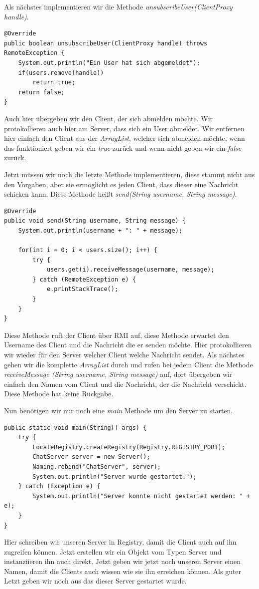 
Als nächstes implementieren wir die Methode \textit{unsubscribeUser(ClientProxy handle)}.
\begin{lstlisting}
@Override
public boolean unsubscribeUser(ClientProxy handle) throws RemoteException {
	System.out.println("Ein User hat sich abgemeldet");
	if(users.remove(handle))
		return true;
	return false;
}
\end{lstlisting}
Auch hier übergeben wir den Client, der sich abmelden möchte. Wir protokollieren auch hier am Server, dass sich ein User abmeldet. Wir entfernen hier einfach den Client aus der \textit{ArrayList}, welcher sich abmelden möchte, wenn das funktioniert geben wir ein \textit{true} zurück und wenn nicht geben wir ein \textit{false} zurück.


Jetzt müssen wir noch die letzte Methode implementieren, diese stammt nicht aus den Vorgaben, aber sie ermöglicht es jeden Client, dass dieser eine Nachricht schicken kann. Diese Methode heißt \textit{send(String username, String message)}.
\begin{lstlisting}
@Override
public void send(String username, String message) {
	System.out.println(username + ": " + message);
	
	for(int i = 0; i < users.size(); i++) {
		try {
			users.get(i).receiveMessage(username, message);
		} catch (RemoteException e) {
			e.printStackTrace();		
		}
	}
}
\end{lstlisting}
Diese Methode ruft der Client über RMI auf, diese Methode erwartet den Username des Client und die Nachricht die er senden möchte. Hier protokollieren wir wieder für den Server welcher Client welche Nachricht sendet. Als nächstes gehen wir die komplette \textit{ArrayList} durch und rufen bei jedem Client die Methode \textit{receiveMessage (String username, String message)} auf, dort übergeben wir einfach den Namen vom Client und die Nachricht, der die Nachricht verschickt. Diese Methode hat keine Rückgabe.


Nun benötigen wir nur noch eine \textit{main} Methode um den Server zu starten.
\begin{lstlisting}
public static void main(String[] args) {
	try {
		LocateRegistry.createRegistry(Registry.REGISTRY_PORT);
		ChatServer server = new Server();
		Naming.rebind("ChatServer", server);
		System.out.println("Server wurde gestartet.");
	} catch (Exception e) {
		System.out.println("Server konnte nicht gestartet werden: " + e);
	}
}
\end{lstlisting}
Hier schreiben wir unseren Server in Registry, damit die Client auch auf ihn zugreifen können. Jetzt erstellen wir ein Objekt vom Typen Server und instanziieren ihn auch direkt. Jetzt geben wir jetzt noch unseren Server einen Namen, damit die Clients auch wissen wie sie ihn erreichen können. Als guter Letzt geben wir noch aus das dieser Server gestartet wurde.

